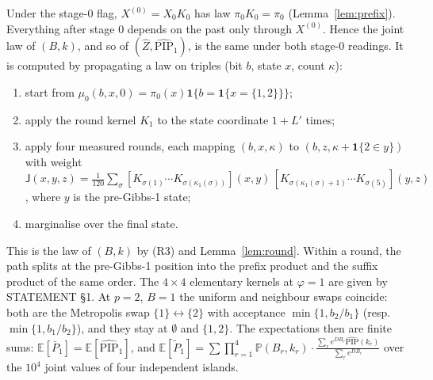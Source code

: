 \documentclass[11pt]{article}
\theoremstyle{remark}
\newcommand{\E}{\mathbb{E}}
\renewcommand{\P}{\mathbb{P}}
\newcommand{\Zh}{\widehat Z}
\newcommand{\PIPh}{\widehat{\mathrm{PIP}}}
\newcommand{\ind}{\mathbf 1}
\begin{document}
Under the stage-0 flag, $X^{(0)}=X_0K_0$ has law $\pi_0K_0=\pi_0$ (Lemma~\ref{lem:prefix}). Everything after stage 0 depends on the past only through $X^{(0)}$. Hence the joint law of $(B,k)$, and so of $(\Zh,\PIPh_1)$, is the same under both stage-0 readings. It is computed by propagating a law on triples (bit $b$, state $x$, count $\kappa$):
\begin{enumerate}[label=(\arabic*)]
\item start from $\mu_0(b,x,0)=\pi_0(x)\ind\{b=\ind\{x=\{1,2\}\}\}$;
\item apply the round kernel $K_1$ to the state coordinate $1+L'$ times;
\item apply four measured rounds, each mapping $(b,x,\kappa)$ to $(b,z,\kappa+\ind\{2\in y\})$ with weight
$\mathsf J(x,y,z)=\frac1{120}\sum_\sigma[K_{\sigma(1)}\cdots K_{\sigma(\kappa_1(\sigma))}](x,y)\,[K_{\sigma(\kappa_1(\sigma)+1)}\cdots K_{\sigma(5)}](y,z)$,
where $y$ is the pre-Gibbs-1 state;
\item marginalise over the final state.
\end{enumerate}
This is the law of $(B,k)$ by (R3) and Lemma~\ref{lem:round}. Within a round, the path splits at the pre-Gibbs-1 position into the prefix product and the suffix product of the same order. The $4\times4$ elementary kernels at $\varphi=1$ are given by STATEMENT \S1. At $p=2$, $B=1$ the uniform and neighbour swaps coincide: both are the Metropolis swap $\{1\}\leftrightarrow\{2\}$ with acceptance $\min\{1,b_2/b_1\}$ (resp.\ $\min\{1,b_1/b_2\}$), and they stay at $\emptyset$ and $\{1,2\}$. The expectations then are finite sums: $\E[\bar P_1]=\E[\PIPh_1]$, and
$\E[\tilde P_1]=\sum\prod_{r=1}^4\P(B_r,k_r)\cdot\frac{\sum_re^{DB_r}\PIPh(k_r)}{\sum_re^{DB_r}}$ over the $10^4$ joint values of four independent islands.
\end{document}
